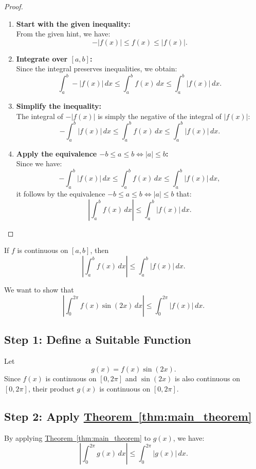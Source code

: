 \documentclass{article}
\begin{document}
\begin{proof}
    \begin{enumerate}
    \item \textbf{Start with the given inequality:} \\
    From the given hint, we have:
    \[
    -|f(x)| \leq f(x) \leq |f(x)|.
    \]

    \item \textbf{Integrate over $[a,b]$:} \\
    Since the integral preserves inequalities, we obtain:
    \[
    \int_a^b -|f(x)| \, dx \leq \int_a^b f(x) \, dx \leq \int_a^b |f(x)| \, dx.
    \]

    \item \textbf{Simplify the inequality:} \\
    The integral of $-|f(x)|$ is simply the negative of the integral of $|f(x)|$:
    \[
    -\int_a^b |f(x)| \, dx \leq \int_a^b f(x) \, dx \leq \int_a^b |f(x)| \, dx.
    \]

    \item \textbf{Apply the equivalence $-b \leq a \leq b \iff |a| \leq b$:} \\
    Since we have:
    \[
    -\int_a^b |f(x)| \, dx \leq \int_a^b f(x) \, dx \leq \int_a^b |f(x)| \, dx,
    \]
    it follows by the equivalence $-b \leq a \leq b \iff |a| \leq b$ that:
    \[
    \left| \int_a^b f(x) \, dx \right| \leq \int_a^b |f(x)| \, dx.
    \]
\end{enumerate}
\end{proof}
\begin{theorem}\label{thm:main_theorem}
    If $f$ is continuous on $[a,b]$, then
\[
\left| \int_a^b f(x) \, dx \right| \leq \int_a^b |f(x)| \, dx.
\]
\end{theorem}

We want to show that
\[
\left| \int_0^{2\pi} f(x)\sin(2x) \, dx \right| \leq \int_0^{2\pi} |f(x)| \, dx.
\]
\proof
\subsection*{Step 1: Define a Suitable Function}
Let 
\[
g(x) = f(x)\sin(2x).
\]
Since $f(x)$ is continuous on $[0, 2\pi]$ and $\sin(2x)$ is also continuous on $[0, 2\pi]$, their product $g(x)$ is continuous on $[0, 2\pi]$.

\subsection*{Step 2: Apply \texorpdfstring{\hyperref[thm:main_theorem]{Theorem~\ref*{thm:main_theorem}}}{Theorem}}
By applying \hyperref[thm:main_theorem]{Theorem~\ref*{thm:main_theorem}} to $g(x)$, we have:
\[
\left| \int_0^{2\pi} g(x) \, dx \right| \leq \int_0^{2\pi} |g(x)| \, dx.
\]
\end{document}
